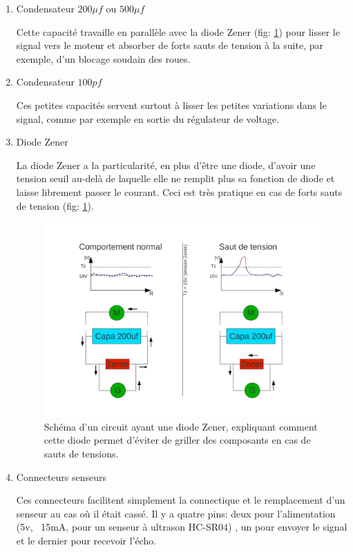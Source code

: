 \documentclass[a4paper,11pt]{report}
\begin{document}
{\begin{enumerate}
\begin{enumerate}
\begin{enumerate}
\item Condensateur $200\mu f$ ou $500\mu f$

Cette capacité travaille en parallèle avec la diode Zener (fig: \ref{zener}) pour lisser le signal vers le  moteur et absorber de forts sauts de tension à la suite, par
exemple, d'un blocage soudain des roues.

\item Condensateur $100pf$

Ces petites capacités servent surtout à lisser les petites variations dans le signal, comme par exemple en sortie du régulateur de voltage.

\item Diode Zener

La diode Zener a la particularité, en plus d'être une diode, d'avoir une tension seuil au-delà de laquelle elle ne remplit plus sa fonction de diode et laisse librement passer le courant. Ceci est très pratique en cas de forts sauts de tension (fig: \ref{zener}). 

\begin{figure}[h]
\centering
\includegraphics[width=1.0\textwidth]{CircuitZener.pdf} 
    \caption[Utilisation de la diode Zener]{\label{zener} Schéma d'un circuit ayant une diode Zener, expliquant comment cette diode permet d'éviter de griller des composants en cas de sauts de tensions. 
    }
\end{figure}


\item Connecteurs senseurs

Ces connecteurs facilitent simplement la connectique et le remplacement d'un senseur au cas où il était cassé. Il y a quatre pins: deux pour l'alimentation (5v, ~15mA, pour un senseur à ultrason HC-SR04) \cite{HC-SR04}, un pour envoyer le signal et le dernier pour recevoir l'écho.


\end{enumerate}
\end{enumerate}
\end{enumerate}}
\end{document}

